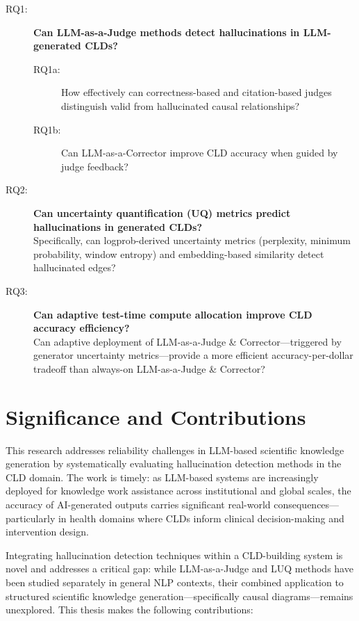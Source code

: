 \begin{description}
    \item[RQ1:] \textbf{Can LLM-as-a-Judge methods detect hallucinations in LLM-generated CLDs?}
    \begin{description}
        \item[RQ1a:] How effectively can correctness-based and citation-based judges distinguish valid from hallucinated causal relationships?
        \item[RQ1b:] Can LLM-as-a-Corrector improve CLD accuracy when guided by judge feedback?
    \end{description}
    
    \item[RQ2:] \textbf{Can uncertainty quantification (UQ) metrics predict hallucinations in generated CLDs?}\\
    Specifically, can logprob-derived uncertainty metrics (perplexity, minimum probability, window entropy) and embedding-based similarity detect hallucinated edges?
    
    \item[RQ3:] \textbf{Can adaptive test-time compute allocation improve CLD accuracy efficiency?}\\
    Can adaptive deployment of LLM-as-a-Judge \& Corrector---triggered by generator uncertainty metrics---provide a more efficient accuracy-per-dollar tradeoff than always-on LLM-as-a-Judge \& Corrector?
\end{description}

\section*{Significance and Contributions}

This research addresses reliability challenges in LLM-based scientific knowledge generation by systematically evaluating hallucination detection methods in the CLD domain. The work is timely: as LLM-based systems are increasingly deployed for knowledge work assistance across institutional and global scales, the accuracy of AI-generated outputs carries significant real-world consequences---particularly in health domains where CLDs inform clinical decision-making and intervention design.

Integrating hallucination detection techniques within a CLD-building system is novel and addresses a critical gap: while LLM-as-a-Judge and LUQ methods have been studied separately in general NLP contexts, their combined application to structured scientific knowledge generation---specifically causal diagrams---remains unexplored. This thesis makes the following contributions:

